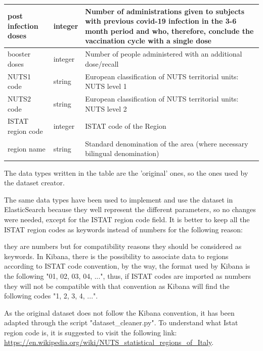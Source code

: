 \documentclass{article}
\begin{document}
\newpage
\begin{center}
\begin{tabular}{ |m{4cm}|m{2cm}|m{4.5cm}|}
\hline
  post infection doses & integer & Number of administrations given to subjects with previous covid-19 infection in the 3-6 month period and who, therefore, conclude the vaccination cycle with a single dose\\ 
    \hline
  booster doses & integer & Number of people administered with an additional dose/recall\\ 
    \hline
  NUTS1 code & string & European classification of NUTS territorial units: NUTS level 1\\ 
    \hline
  NUTS2 code & string & European classification of NUTS territorial units: NUTS level 2\\ 
    \hline
  ISTAT region code & integer & ISTAT code of the Region\\
    \hline
  region name & string & Standard denomination of the area (where necessary bilingual denomination)\\ 
  \hline
  \end{tabular}
\end{center}
\hfill\break
The data types written in the table are the 'original' ones, so the ones used by the dataset creator. 

The same data types have been used to implement and use the dataset in ElasticSearch because they well represent the different parameters, so no changes were needed, except for the ISTAT region code field.
It is better to keep all the ISTAT region codes as keywords instead of numbers for the following reason:

they are numbers but for compatibility reasons they should be considered as keywords. In Kibana, there is the possibility to associate data to regions according to ISTAT code convention, by the way, the format used by Kibana is the following "01, 02, 03, 04, ...", thus, if ISTAT codes are imported as numbers they will not be compatible with that convention as Kibana will find the following codes "1, 2, 3, 4, ...".

As the original dataset does not follow the Kibana convention, it has been adapted through the script {\selectfont"dataset\_cleaner.py"}.
\hfill\break
\hfill\break
To understand what Istat region code is, it is suggested to visit the following link: \url{https://en.wikipedia.org/wiki/NUTS\_statistical\_regions\_of\_Italy}.

\end{document}
